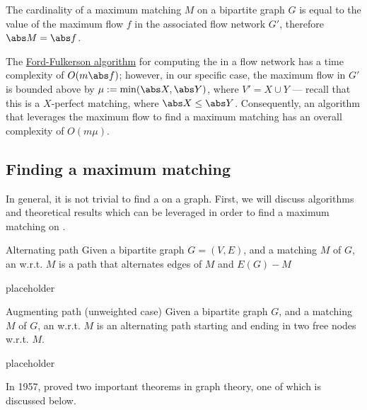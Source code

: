 \documentclass[a4paper, 12pt]{report}
\begin{document}
    \begin{framedcor}{}
        The cardinality of a maximum matching $M$ on a bipartite graph $G$ is equal to the value of the maximum flow $f$ in the associated flow network $G'$, therefore $\abs M = \abs f$.
    \end{framedcor}

    The \href{https://en.wikipedia.org/wiki/Ford%E2%80%93Fulkerson_algorithm}{Ford-Fulkerson algorithm} for computing the \tit{maximum flow} in a flow network has a time complexity of $O(m \abs f)$; however, in our specific case, the maximum flow in $G'$ is bounded above by $\mu := \min(\abs X, \abs Y)$, where $V' = X \cup Y$ --- recall that this is a $X$-perfect matching, where $\abs X \le \abs Y$. Consequently, an algorithm that leverages the maximum flow to find a maximum matching has an overall complexity of $O(m \mu)$.

    \subsection{Finding a maximum matching}

    In general, it is not trivial to find a  on a graph. First, we will discuss algorithms and theoretical results which can be leveraged in order to find a maximum matching on .

    \begin{frameddefn}{Alternating path}
        Given a bipartite graph $G = (V, E)$, and a matching $M$ of $G$, an  w.r.t. $M$ is a path that alternates edges of $M$ and $E(G) - M$
    \end{frameddefn}

    \begin{example}
        placeholder 
    \end{example}

    \begin{frameddefn}[label={aug path}]{Augmenting path (unweighted case)}
        Given a bipartite graph $G$, and a matching $M$ of $G$, an  w.r.t. $M$ is an alternating path starting and ending in two free nodes w.r.t. $M$.
    \end{frameddefn}

    \begin{example}
        placeholder 
    \end{example}

    In 1957, \textcite{berge} proved two important theorems in graph theory, one of which is discussed below.
\end{document}

